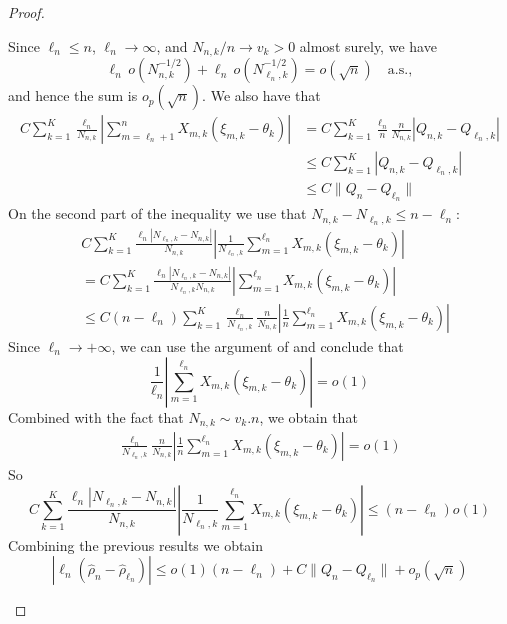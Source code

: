 \begin{proof}
\begin{enumerate}[label=(\roman*)]
		Since \(\ell_n\leq n\), \(\ell_n\to\infty\), and \(N_{n,k}/n\to v_k>0\) almost surely, we have
		\[
		\ell_n\,o(N_{n,k}^{-1/2})+\ell_n\,o(N_{\ell_n,k}^{-1/2})
		=o(\sqrt n)\quad\text{a.s.},
		\]
		and hence the sum is \(o_p(\sqrt n)\).
		We also have that
		\begin{align*}
			C\sum_{k=1}^{K}\frac{\ell_n}{N_{n,k}}\left|\sum_{m=\ell_n+1}^{n}X_{m,k}(\xi_{m,k}-\theta_k)\right|
			&=C\sum_{k=1}^{K}\frac{\ell_n}{n}\frac{n}{N_{n,k}}|Q_{n,k}-Q_{\ell_n,k}|\\
			&\le C\sum_{k=1}^{K}|Q_{n,k}-Q_{\ell_n,k}|\\
			&\le C\|Q_n-Q_{\ell_n}\|
		\end{align*}	
		On the second part of the inequality we use that \(N_{n,k} - N_{\ell_{n}, k} \leq n - \ell_n\):
		\begin{align*}
			&C\sum_{k=1}^{K}\frac{\ell_n|N_{\ell_n,k}-N_{n,k}|}{N_{n,k}}\left|\frac{1}{N_{\ell_n,k}}\sum_{m=1}^{\ell_n}X_{m,k}(\xi_{m,k}-\theta_k)\right|\\&= C\sum_{k=1}^{K}\frac{\ell_n|N_{\ell_n,k}-N_{n,k}|}{N_{\ell_n,k}N_{n,k}}\left|\sum_{m=1}^{\ell_n}X_{m,k}(\xi_{m,k}-\theta_k)\right|\\
			& \leq C(n-\ell_n) \sum_{k=1}^{K}\frac{\ell_n}{N_{\ell_n,k}}\frac{n}{N_{n,k}} \left|\frac{1}{n}\sum_{m=1}^{\ell_n}X_{m,k}(\xi_{m,k}-\theta_k)\right|
		\end{align*}
		Since \(\ell_n \to +\infty\), we can use the argument of \cite{Doob1936} and conclude that
		\[\frac{1}{\ell_n}\left|\sum_{m=1}^{\ell_n}X_{m,k}(\xi_{m,k}-\theta_k)\right| = o(1)\]
		Combined with the fact that \(N_{n,k} \sim v_k.n\), we obtain that
		\begin{align*}
			\frac{\ell_n}{N_{\ell_n,k}}\frac{n}{N_{n,k}}\left|\frac{1}{n}\sum_{m=1}^{\ell_n}X_{m,k}(\xi_{m,k}-\theta_k)\right| = o(1)
		\end{align*}
		So
		\begin{equation*}
			C\sum_{k=1}^{K}\frac{\ell_n|N_{\ell_n,k}-N_{n,k}|}{N_{n,k}}\left|\frac{1}{N_{\ell_n,k}}\sum_{m=1}^{\ell_n}X_{m,k}(\xi_{m,k}-\theta_k)\right| \leq (n-\ell_n) o(1)
		\end{equation*}
		Combining the previous results we obtain
		\[
		|\ell_n(\hat{\rho}_n - \hat{\rho}_{\ell_n})| \le o(1)(n-\ell_n) + C\|Q_n - Q_{\ell_n}\| + o_p(\sqrt{n})
		\]
	\end{enumerate}
\end{proof}

